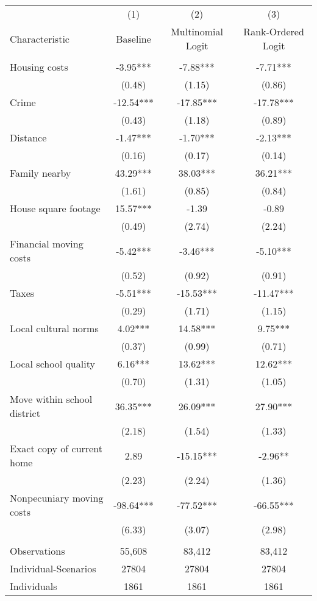 \begin{tabular}{lccc} \hline
 & (1) & (2) & (3) \\
Characteristic & Baseline & Multinomial Logit & Rank-Ordered Logit \\ \hline
 &  &  &  \\
Housing costs & -3.95*** & -7.88*** & -7.71*** \\
 & (0.48) & (1.15) & (0.86) \\
Crime & -12.54*** & -17.85*** & -17.78*** \\
 & (0.43) & (1.18) & (0.89) \\
Distance & -1.47*** & -1.70*** & -2.13*** \\
 & (0.16) & (0.17) & (0.14) \\
Family nearby & 43.29*** & 38.03*** & 36.21*** \\
 & (1.61) & (0.85) & (0.84) \\
House square footage & 15.57*** & -1.39 & -0.89 \\
 & (0.49) & (2.74) & (2.24) \\
Financial moving costs & -5.42*** & -3.46*** & -5.10*** \\
 & (0.52) & (0.92) & (0.91) \\
Taxes & -5.51*** & -15.53*** & -11.47*** \\
 & (0.29) & (1.71) & (1.15) \\
Local cultural norms & 4.02*** & 14.58*** & 9.75*** \\
 & (0.37) & (0.99) & (0.71) \\
Local school quality & 6.16*** & 13.62*** & 12.62*** \\
 & (0.70) & (1.31) & (1.05) \\
Move within school district & 36.35*** & 26.09*** & 27.90*** \\
 & (2.18) & (1.54) & (1.33) \\
Exact copy of current home & 2.89 & -15.15*** & -2.96** \\
 & (2.23) & (2.24) & (1.36) \\
Nonpecuniary moving costs & -98.64*** & -77.52*** & -66.55*** \\
 & (6.33) & (3.07) & (2.98) \\
 &  &  &  \\
Observations & 55,608 & 83,412 & 83,412 \\
Individual-Scenarios & 27804 & 27804 & 27804 \\
 Individuals & 1861 & 1861 & 1861 \\ \hline
\end{tabular}
